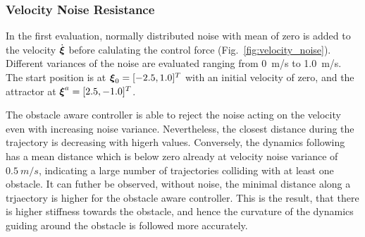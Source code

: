 \subsubsection{Velocity Noise Resistance}
In the first evaluation, normally distributed noise with mean of zero is added to the velocity $\dot{\boldsymbol{ \xi}}$ before calulating the control force (Fig.~\ref{fig:velocity_noise}). Different variances of the noise are evaluated ranging from \qty{0}{m/s} to \qty{1.0}{m/s}. The start position is at $\boldsymbol{\xi}_0 = [-2.5, 1.0]^T$ with an initial velocity of zero, and  the attractor at $\boldsymbol{\xi}^a = [2.5, -1.0]^T$.

The obstacle aware controller is able to reject the noise acting on the velocity even with increasing noise variance. Nevertheless, the closest distance during the trajectory is decreasing with higerh values.
Conversely, the dynamics following has a mean distance which is below zero already at velocity noise variance of $\qty{0.5}{m/s}$, indicating a large number of trajectories colliding with at least one obstacle. 
It can futher be observed, without noise, the minimal distance along a trjaectory is higher for the obstacle aware controller. This is the result, that there is higher stiffness towards the obstacle, and hence the curvature of the dynamics guiding around the obstacle is followed more accurately.


